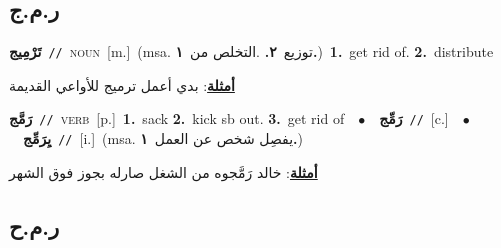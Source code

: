 \documentclass[10pt,a4paper,twoside]{article} %
\begin{document}
\begin{multicols}{2}
\vspace{-3mm}
\subsection*{\color{blue}\foreignlanguage{arabic}{ر.م.ج}\color{blue}{}} 

{\setlength\topsep{0pt}\textbf{\foreignlanguage{arabic}{تَرْمِيج}}\ {\color{gray}\texttt{//}\color{black}}\ \textsc{noun}\ [m.]\ \color{gray}(msa. \foreignlanguage{arabic}{توزيع}~\foreignlanguage{arabic}{\textbf{٢.}}  .\foreignlanguage{arabic}{التخلص من}~\foreignlanguage{arabic}{\textbf{١.}})\color{black}\ \textbf{1.}~get rid of.  \textbf{2.}~distribute\  \begin{flushright}\color{gray}\foreignlanguage{arabic}{\textbf{\underline{\foreignlanguage{arabic}{أمثلة}}}: بدي أعمل ترميج للأواعي القديمة}\end{flushright}\color{black}} \vspace{2mm}

{\setlength\topsep{0pt}\textbf{\foreignlanguage{arabic}{رَمَّج}}\ {\color{gray}\texttt{//}\color{black}}\ \textsc{verb}\ [p.]\ \textbf{1.}~sack  \textbf{2.}~kick sb out.  \textbf{3.}~get rid of\ \ $\bullet$\ \ \setlength\topsep{0pt}\textbf{\foreignlanguage{arabic}{رَمِّج}}\ {\color{gray}\texttt{//}\color{black}}\ [c.]\ \ $\bullet$\ \ \setlength\topsep{0pt}\textbf{\foreignlanguage{arabic}{يِرَمِّج}}\ {\color{gray}\texttt{//}\color{black}}\ [i.]\ \color{gray}(msa. \foreignlanguage{arabic}{يفصِل شخص عن العمل}~\foreignlanguage{arabic}{\textbf{١.}})\color{black}\  \begin{flushright}\color{gray}\foreignlanguage{arabic}{\textbf{\underline{\foreignlanguage{arabic}{أمثلة}}}: خالد رَمَّجوه من الشغل صارله بجوز فوق الشهر}\end{flushright}\color{black}} \vspace{2mm}

\vspace{-3mm}
\subsection*{\color{blue}\foreignlanguage{arabic}{ر.م.ح}\color{blue}{}} 


\end{multicols}
\end{document}
